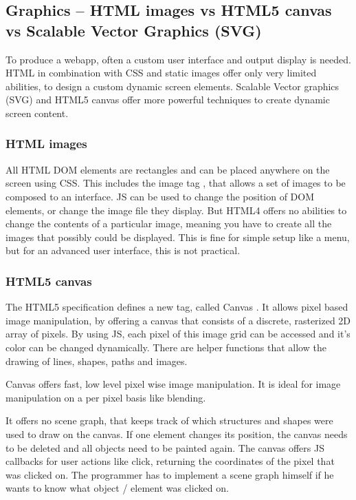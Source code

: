 \subsection{Graphics -- HTML images vs HTML5 canvas vs Scalable Vector Graphics (SVG)}
\label{sec:graphics}

To produce a webapp, often a custom user interface and output display is needed.
HTML in combination with CSS and static images offer only very limited abilities, to design a custom dynamic screen elements.
Scalable Vector graphics (SVG) and HTML5 canvas offer more powerful techniques to create dynamic screen content.


\subsubsection{HTML images}
\label{sec:htmlimg}

All HTML DOM elements are rectangles and can be placed anywhere on the screen using CSS.
This includes the image tag , that allows a set of images to be composed to an interface.
JS can be used to change the position of DOM elements, or change the image file they display.
But HTML4 offers no abilities to change the contents of a particular image, meaning you have to create all the images that possibly could be displayed.
This is fine for simple setup like a menu, but for an advanced user interface, this is not practical.


\subsubsection{HTML5 canvas}
\label{sec:canvas}

The HTML5 specification defines a new tag, called Canvas .
It allows pixel based image manipulation, by offering a canvas that consists of a discrete, rasterized 2D array of pixels.
By using JS, each pixel of this image grid can be accessed and it's color can be changed dynamically.
There are helper functions that allow the drawing of lines, shapes, paths and images.

Canvas offers fast, low level pixel wise image manipulation.
It is ideal for image manipulation on a per pixel basis like blending.

It offers no scene graph, that keeps track of which structures and shapes were used to draw on the canvas.
If one element changes its position, the canvas needs to be deleted and all objects need to be painted again.
The canvas offers JS callbacks for user actions like click, returning the coordinates of the pixel that was clicked on.
The programmer has to implement a scene graph himself if he wants to know what object / element was clicked on.

